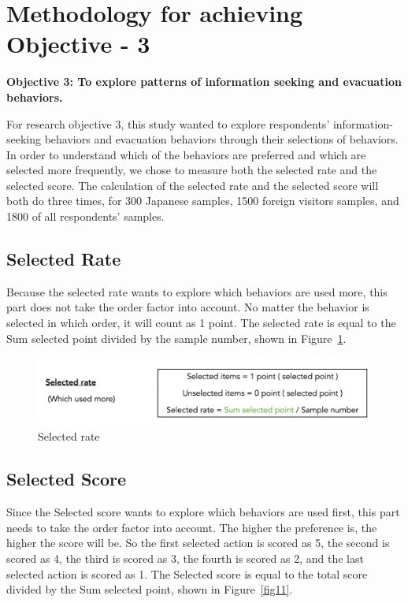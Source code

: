 \section{Methodology for achieving Objective - 3}

\textbf{Objective 3: To explore patterns of information seeking and evacuation behaviors.}

For research objective 3, this study wanted to explore respondents' information-seeking behaviors and evacuation behaviors through their selections of behaviors. In order to understand which of the behaviors are preferred and which are selected more frequently, we chose to measure both the selected rate and the selected score. The calculation of the selected rate and the selected score will both do three times, for 300 Japanese samples, 1500 foreign visitors samples, and 1800 of all respondents' samples.

\subsection{Selected Rate}
Because the selected rate wants to explore which behaviors are used more, this part does not take the order factor into account. No matter the behavior is selected in which order, it will count as 1 point. The selected rate is equal to the Sum selected point divided by the sample number, shown in Figure~\ref{fig10}.

\begin{figure}[h]
  \includegraphics[width=\linewidth]{Figure/Figure10.png}
  \centering
  \caption{Selected rate }
  \label{fig10}
\end{figure}

\subsection{Selected Score}

Since the Selected score wants to explore which behaviors are used first, this part needs to take the order factor into account. The higher the preference is, the higher the score will be. So the first selected action is scored as 5, the second is scored as 4, the third is scored as 3, the fourth is scored as 2, and the last selected action is scored as 1. The Selected score is equal to the total score divided by the Sum selected point, shown in Figure~\ref{fig11}.

